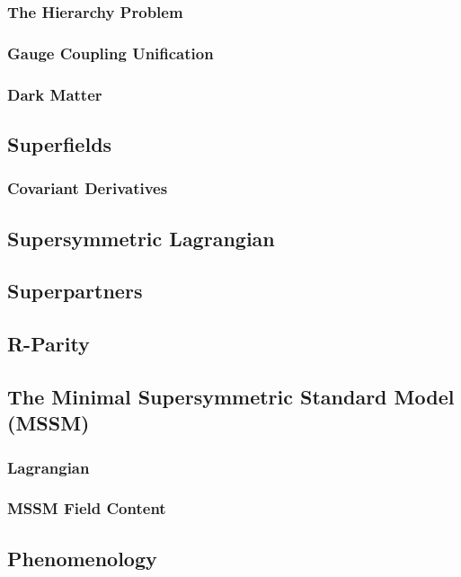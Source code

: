 \documentclass[twoside,english]{uiofysmaster}
\begin{document}
\subsubsection{The Hierarchy Problem}

\subsubsection{Gauge Coupling Unification}

\subsubsection{Dark Matter}

\subsection{Superfields}

\subsubsection{Covariant Derivatives}

\subsection{Supersymmetric Lagrangian}

\subsection{Superpartners}

\subsection{R-Parity}

\subsection{The Minimal Supersymmetric Standard Model (MSSM)}

\subsubsection{Lagrangian}

\subsubsection{MSSM Field Content}

\subsection{Phenomenology}
\end{document}
